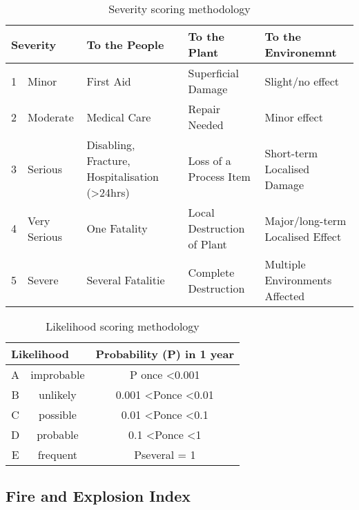 \begin{table}[H]
\centering
\caption{Severity scoring methodology}
\label{tab:severity-methodology}
\begin{tabularx}{\linewidth}{llXXX}
\toprule
\multicolumn{2}{l}{\textbf{Severity}} & \textbf{To the People}                                     & \textbf{To the Plant}      & \textbf{To the Environemnt}      \\ \midrule
1          & Minor             & First Aid                                                  & Superficial Damage         & Slight/no effect                 \\
2          & Moderate          & Medical Care                                               & Repair Needed              & Minor effect                     \\
3          & Serious           & Disabling, Fracture, Hospitalisation (\textgreater{}24hrs) & Loss of a Process Item     & Short-term Localised Damage      \\
4          & Very Serious      & One Fatality                                               & Local Destruction of Plant & Major/long-term Localised Effect \\
5          & Severe            & Several Fatalitie                                          & Complete Destruction       & Multiple Environments Affected   \\ \bottomrule
\end{tabularx}
\end{table}

\begin{table}[H]
\centering
\caption{Likelihood scoring methodology}
\label{tab:likelihood-methodology}
\begin{tabular}{ccc}
\toprule
\multicolumn{2}{l}{Likelihood} & Probability (P) in 1 year              \\ \midrule
A & improbable & P once \textless   0.001               \\
B & unlikely   & 0.001 \textless Ponce   \textless 0.01 \\
C & possible   & 0.01 \textless Ponce   \textless 0.1   \\
D & probable   & 0.1 \textless Ponce   \textless 1      \\
E & frequent   & Pseveral   = 1                         \\ \bottomrule
\end{tabular}
\end{table}

\subsection{Fire and Explosion Index}

